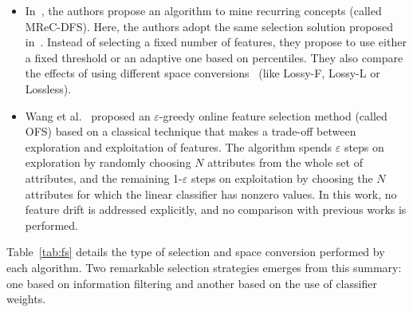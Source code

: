 \documentclass[preprint,12pt]{elsarticle}
\begin{document}
\begin{itemize}
	\item In~\cite{gomes14}, the authors propose an algorithm to mine recurring concepts (called MReC-DFS). Here, the authors adopt the same selection solution proposed in~\cite{kata05}. Instead of selecting a fixed number of features, they propose to use either a fixed threshold or an adaptive one based on percentiles. They also compare the effects of using different space conversions~\cite{masud10} (like Lossy-F, Lossy-L or Lossless).
	\item Wang et al.~\cite{wang14} proposed an $\varepsilon$-greedy online feature selection method (called OFS) based on a classical technique that makes a trade-off between exploration and exploitation of features. The algorithm spends $\varepsilon$ steps on exploration by randomly choosing $N$ attributes from the whole set of attributes, and the remaining 1-$\varepsilon$ steps on exploitation by choosing the $N$ attributes for which the linear classifier has nonzero values. %
In this work, no feature drift is addressed explicitly, and no comparison with previous works is performed.
\end{itemize}

Table~\ref{tab:fs} details the type of selection and space conversion performed by each algorithm. Two remarkable selection strategies emerges from this summary: one based on information filtering and another based on the use of classifier weights. 

\begin{table}[!htp]
\renewcommand{\arraystretch}{1.3}
\centering
\scriptsize
\caption{Summary description of streaming feature selection methods. Information about the type of selector (wrapper or filter) and the conversion between spaces is presented below.}
\label{tab:fs}
\end{table}
\end{document}
